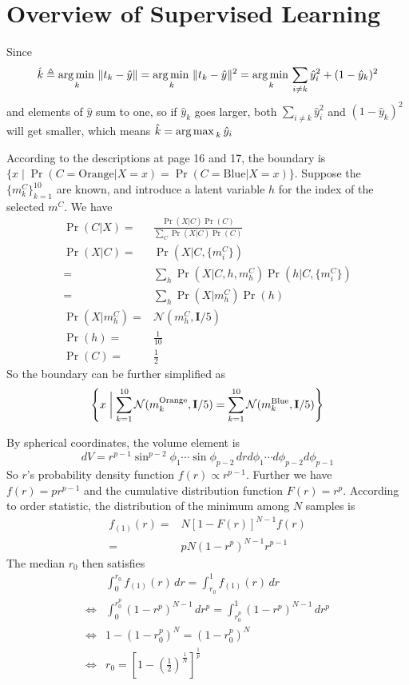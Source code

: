 \section{Overview of Supervised Learning}

\begin{sol}
Since
\[
\hat{k}\triangleq\operatorname*{arg\,min\,}_k\|t_k-\hat{y}\|=\operatorname*{arg\,min\,}_k\|t_k-\hat{y}\|^2=\operatorname*{arg\,min\,}_k\sum_{i\ne k}\hat{y}_i^2+(1-\hat{y}_k)^2
\]
and elements of $\hat{y}$ sum to one, so if $\hat{y}_k$ goes larger, both $\sum_{i\ne k}\hat{y}_i^2$ and $(1-\hat{y}_k)^2$ will get smaller, which means $\hat{k}=\operatorname*{arg\,max\,}_k\hat{y}_i$ 
\end{sol}

\begin{sol}
According to the descriptions at page 16 and 17, the boundary is $\{x\mid \Pr(C=\mathrm{Orange}\vert X=x) =\Pr(C=\mathrm{Blue}\vert X=x)\}$. Suppose the $\{m_k^C\}_{k=1}^{10}$ are known, and introduce a latent variable $h$ for the index of the selected $m^C$. We have
\begin{align*}
\Pr(C\vert X) =& \frac{\Pr(X\vert C)\Pr(C)}{\sum_C\Pr(X\vert C)\Pr(C)}\\
\Pr(X\vert C) =& \Pr(X\vert C,\{m_i^C\})\\
=& \sum_h\Pr(X\vert C,h,m_h^C)\Pr(h\vert C,\{m_i^C\})\\
=& \sum_h\Pr(X\vert m_h^C)\Pr(h)\\
\Pr(X\vert m_h^C) =& \mathcal{N}(m_h^C,\mathbf{I}/5)\\
\Pr(h) =& \frac{1}{10}\\
\Pr(C) =& \frac{1}{2}
\end{align*}
So the boundary can be further simplified as
\[
\left\{x\biggm| \sum_{k=1}^{10} \mathcal{N}(m_k^\mathrm{Orange},\mathbf{I}/5)=\sum_{k=1}^{10} \mathcal{N}(m_k^\mathrm{Blue},\mathbf{I}/5)\right\}
\]
\end{sol}

\begin{sol}
By spherical coordinates, the volume element is \[
dV=r^{p-1}\sin^{p-2}\phi_1\cdots\sin\phi_{p-2}\,drd\phi_1\cdots d\phi_{p-2}d\phi_{p-1}
\]
So $r$'s probability density function $f(r)\propto r^{p-1}$. Further we have $f(r)=pr^{p-1}$ and the cumulative distribution function $F(r)=r^p$. According to order statistic, the distribution of the minimum among $N$ samples is
\begin{align*}
f_{(1)}(r) =& N\left[1-F(r)\right]^{N-1}f(r)\\
=& pN\left(1-r^p\right)^{N-1}r^{p-1}
\end{align*}
The median $r_0$ then satisfies
\begin{align*}
& \int_0^{r_0}f_{(1)}(r)\,dr=\int_{r_0}^1f_{(1)}(r)\,dr \\
\Longleftrightarrow & \int_0^{r_0^p}\left(1-r^p\right)^{N-1}\,dr^p=\int_{r_0^p}^1\left(1-r^p\right)^{N-1}\,dr^p \\
\Longleftrightarrow & 1-\left(1-r_0^p\right)^N=\left(1-r_0^p\right)^N \\
\Longleftrightarrow & r_0=\left[1-\left(\frac{1}{2}\right)^{\frac{1}{N}}\right]^{\frac{1}{p}}
\end{align*}
\end{sol}

